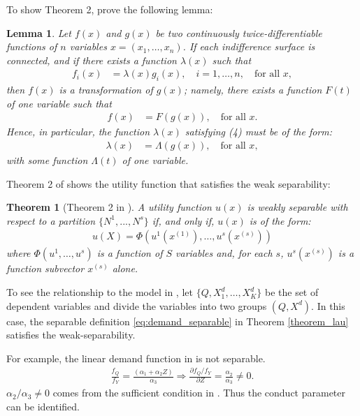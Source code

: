 \documentclass[11pt, a4paper]{article}
\newtheorem{theorem}{Theorem}
\newtheorem{lemma}{Lemma}
\theoremstyle{remark}
\begin{document}
To show Theorem 2, \citet{goldmanNote1964} prove the following lemma:
\begin{lemma}\label{lemma_1_GU}
    Let $f(x)$ and $g(x)$ be two continuously twice-differentiable functions of $n$ variables $x=(x_1, \dots, x_n)$. If each indifference surface is connected, and if there exists a function $\lambda(x)$ such that
    \begin{align}
    f_i(x) &= \lambda(x)g_i(x), \quad i=1, \dots, n, \quad \text{for all } x,
    \end{align}
    then $f(x)$ is a transformation of $g(x)$; namely, there exists a function $F(t)$ of one variable such that
    \begin{align}
    f(x) &= F(g(x)), \quad \text{for all } x.
    \end{align}
    Hence, in particular, the function $\lambda(x)$ satisfying (4) must be of the form:
    \begin{align}
        \lambda(x) &= \Lambda(g(x)), \quad \text{for all } x,
    \end{align}
    with some function $\Lambda(t)$ of one variable.
\end{lemma}

Theorem 2 of \citet{goldmanNote1964} shows the utility function that satisfies the weak separability:
\begin{theorem}[Theorem 2 in \citet{goldmanNote1964}]\label{thorem_2_GU}
    A utility function $u(x)$ is weakly separable with respect to a partition $\{N^1, .. ., N^s\}$ if, and only if, $u(x)$ is of the form: 
    \begin{align}
        u(X) = \Phi(u^1(x^{(1)}),\ldots, u^s(x^{(s)})   )
    \end{align} where $\Phi(u^1,\ldots, u^s)$ is a function of $S$ variables and, for each $s$, $u^s(x^{(s)})$ is a function subvector $x^{(s)}$ alone.
\end{theorem}

To see the relationship to the model in \citet{lau1982identifying}, let $\{Q, X_{1}^{d},\ldots, X_{K}^{d}\}$ be the set of dependent variables and divide the variables into two groups $(Q, X^{d})$.
In this case, the separable definition \ref{eq:demand_separable} in Theorem \ref{theorem_lau} satisfies the weak-separability.

For example, the linear demand function in \citet{bresnahan1982oligopoly} is not separable.
\begin{align}
    \frac{f_Q}{f_Y} = \frac{(\alpha_1 + \alpha_2 Z)}{\alpha_3} \Longrightarrow \frac{\partial f_Q/f_Y}{\partial Z} = \frac{\alpha_2}{\alpha_3} \ne 0.
\end{align}
$\alpha_2/\alpha_3 \ne 0$ comes from the sufficient condition in \citet{matsumura2023resolving}.
Thus the conduct parameter can be identified.
\end{document}

